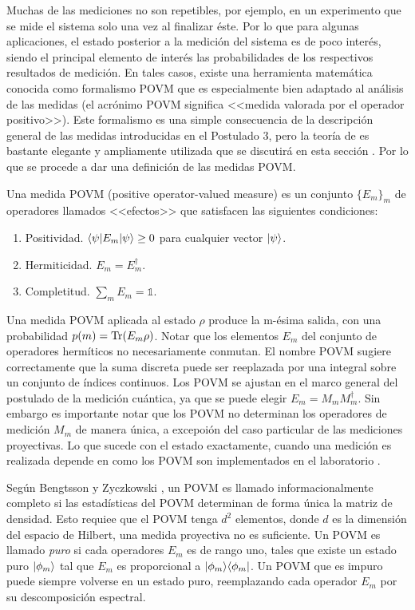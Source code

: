 Muchas de las mediciones no son repetibles, por ejemplo, en un experimento que se mide el sistema solo una vez al finalizar éste. Por lo que para algunas aplicaciones, el estado posterior a la medición del sistema es de poco interés, siendo el principal elemento de interés las probabilidades de los respectivos resultados de medición. En tales casos, existe una herramienta matemática conocida como formalismo POVM que es especialmente bien adaptado al análisis de las medidas (el acrónimo POVM significa <<medida valorada por el operador positivo>>). Este formalismo es una simple consecuencia de la descripción general de las medidas introducidas en el Postulado 3, pero la teoría de es bastante elegante y ampliamente utilizada que se discutirá en esta sección {\cite{nielsen_chuang_2010}}. Por lo que se procede a dar una definición de las medidas POVM\@.

\begin{definition} Una medida POVM (positive operator-valued measure) es un conjunto $\{E_{m}\} _{m}$ de operadores llamados <<efectos>> que satisfacen las siguientes condiciones:
	\begin{enumerate}
		\item Positividad. $\langle \psi |E_m|\psi \rangle \ge 0 $ para cualquier vector $|\psi\rangle$.
		\item Hermiticidad. $E_m=E_{m}^\dagger$.
		\item  Completitud. $\sum_m E_m =\mathds{1}$.
	\end{enumerate}
\end{definition}

Una medida POVM aplicada al estado $\rho$ produce la m-ésima salida, con una probabilidad $p(m)={\rm Tr}(E_m \rho)$. Notar que los elementos $E_m$ del conjunto de operadores hermíticos no necesariamente conmutan. El nombre POVM sugiere correctamente que la suma discreta puede ser reeplazada por una integral sobre un conjunto de índices continuos. Los POVM se ajustan en el marco general del postulado de la medición cuántica, ya que se puede elegir $E_m=M_m M_m^{\dagger}$. Sin embargo es importante notar que los POVM no determinan los operadores de medición $M_m$ de manera única, a excepoión del caso particular de las mediciones proyectivas. Lo que sucede con el estado exactamente, cuando una medición es realizada depende en como los POVM son implementados en el laboratorio {\cite{2007geometry}}.   

Según Bengtsson y Zyczkowski {\cite{2007geometry}}, un POVM es llamado informacionalmente completo si las estadísticas del POVM determinan de forma única la matriz de densidad. Esto requiee que el POVM tenga $d^2$ elementos, donde $d$ es la dimensión del espacio de Hilbert, una medida proyectiva no es suficiente. Un POVM es llamado \textit{puro} si cada operadores $E_m$ es de rango uno, tales que existe un estado puro $|\phi_m\rangle$ tal que $E_m$ es proporcional a $|\phi_m\rangle \langle\phi_m|$. Un POVM que es impuro puede siempre volverse en un estado puro, reemplazando cada operador $E_m$ por su descomposición espectral. 

